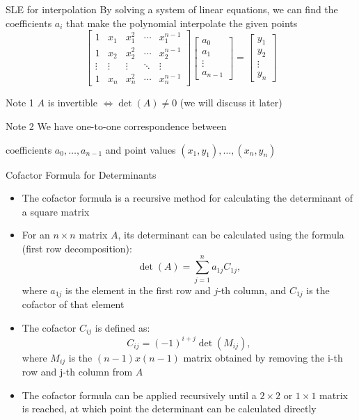 \documentclass[fullscreen=true, bookmarks=true, hyperref={pdfencoding=unicode}]{beamer}
\begin{document}
\begin{frame}{SLE for interpolation}
  By solving a system of linear equations, 
  we can find the coefficients $a_i$ that make the polynomial 
  interpolate the given points
\[
  \begin{bmatrix}
    1      & x_1    & x_1^2  & \cdots & x_1^{n-1} \\
    1      & x_2    & x_2^2  & \cdots & x_2^{n-1} \\
    \vdots & \vdots & \vdots & \ddots & \vdots \\
    1      & x_n    & x_n^2  & \cdots & x_n^{n-1}
  \end{bmatrix}
  \begin{bmatrix}
    a_0 \\
    a_1 \\
    \vdots \\
    a_{n-1}
  \end{bmatrix} =
  \begin{bmatrix}
    y_1 \\
    y_2 \\
    \vdots \\
    y_n
  \end{bmatrix}
\]
\pause
\begin{block}{Note 1}
    $A$ is invertible $\iff \det(A) \neq 0$ (we will discuss it later)
\end{block}
\pause
\begin{block}{Note 2}
  We have one-to-one correspondence between

  coefficients $a_0, \hdots, a_{n-1}$ and point values $(x_1, y_1), \hdots, (x_n, y_n)$
\end{block}
\end{frame}


\begin{frame}{Cofactor Formula for Determinants}
  \begin{itemize}
    \item The cofactor formula is a recursive method for calculating the determinant of a square matrix
    \item For an $n \times n$ matrix $A$, its determinant can be calculated using the formula (first row decomposition):
      \[
      \det(A) = \sum_{j=1}^n a_{1j} C_{1j},
      \]
      where $a_{1j}$ is the element in the first row and $j$-th column, and $C_{1j}$ is the cofactor of that element
    \pause
    \item The cofactor $C_{ij}$ is defined as:
      \[
      C_{ij} = (-1)^{i+j} \det(M_{ij}),
      \]
      where $M_{ij}$ is the $(n-1) x (n-1)$ matrix obtained by removing the i-th row and j-th column from $A$
    \item The cofactor formula can be applied recursively until a $2 \times 2$ or 
    $1 \times 1$ matrix is reached, at which point the determinant 
    can be calculated directly
  \end{itemize}
\end{frame}
\end{document}
